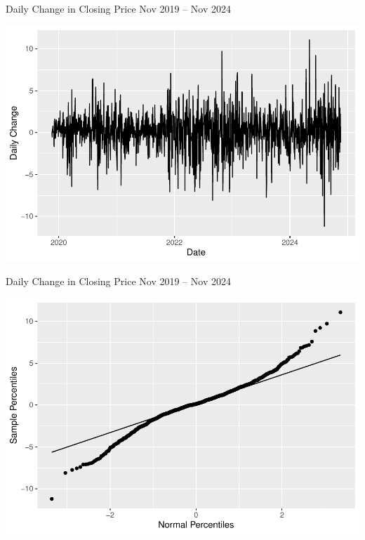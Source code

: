 \begin{frame}
  \begin{block}{Daily Change in Closing Price Nov 2019 -- Nov 2024}
    \begin{center}
       \includegraphics[height=.7\textheight]{figure/plot2-1}
    \end{center}
  \end{block}
\end{frame}



\begin{frame}
  \begin{block}{Daily Change in Closing Price Nov 2019 -- Nov 2024}
    \begin{center}
       \includegraphics[height=.7\textheight]{figure/plot3-1}
    \end{center}
  \end{block}
\end{frame}

